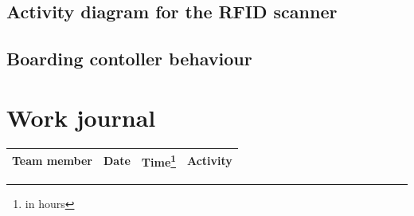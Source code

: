 \documentclass[a4paper]{article}
\begin{document}
\subsection{Activity diagram for the RFID scanner}



\subsection{Boarding contoller behaviour}




\section{Work journal}

\begin{tabularx}{\textwidth}{l l l X}
	\toprule
	Team member & Date & Time\footnote{in hours} & Activity \\ \midrule

	\bottomrule
\end{tabularx}

\clearpage
\glsaddall
\printglossaries
\end{document}

